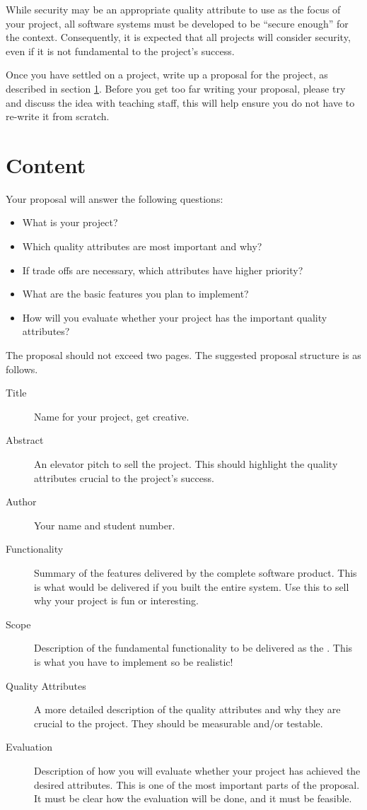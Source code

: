 \documentclass{csse4400}
\begin{document}
\noindent
While security may be an appropriate quality attribute to use as the focus of your project,
all software systems must be developed to be ``secure enough'' for the context.
Consequently, it is expected that all projects will consider security,
even if it is not fundamental to the project's success.

Once you have settled on a project, write up a proposal for the project, as described in section \ref{sect:content}.
Before you get too far writing your proposal,
please try and discuss the idea with teaching staff,
this will help ensure you do not have to re-write it from scratch.


\section{Content}\label{sect:content}
Your proposal will answer the following questions:
\begin{itemize}
    \item What is your project?
    \item Which quality attributes are most important and why?
    \item If trade offs are necessary, which attributes have higher priority?
    \item What are the basic features you plan to implement?
    \item How will you evaluate whether your project has the important quality attributes?
\end{itemize}

\noindent
The proposal should not exceed two pages.
The suggested proposal structure is as follows.

\begin{description}
    \item[Title] Name for your project, get creative.
    \item[Abstract] An elevator pitch to sell the project. This should highlight the quality attributes crucial to the project's success.
    \item[Author] Your name and student number.
    \item[Functionality] Summary of the features delivered by the complete software product. This is what would be delivered if you built the entire system.
                         Use this to sell why your project is fun or interesting.
    \item[Scope] Description of the fundamental functionality to be delivered as the .
                         This is what you have to implement so be realistic!
    \item[Quality Attributes] A more detailed description of the quality attributes and why they are crucial to the project.
                              They should be measurable and/or testable.
    \item[Evaluation] Description of how you will evaluate whether your project has achieved the desired attributes.
                      This is one of the most important parts of the proposal.
                      It must be clear how the evaluation will be done, and it must be feasible.
\end{description}
\end{document}
